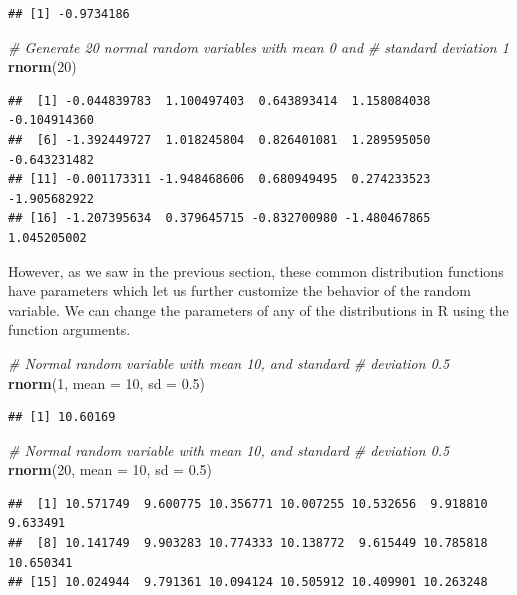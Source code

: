 \documentclass[
]{book}
\newenvironment{Shaded}{\begin{snugshade}}{\end{snugshade}}
\newcommand{\CommentTok}[1]{\textcolor[rgb]{0.56,0.35,0.01}{\textit{#1}}}
\newcommand{\DataTypeTok}[1]{\textcolor[rgb]{0.13,0.29,0.53}{#1}}
\newcommand{\DecValTok}[1]{\textcolor[rgb]{0.00,0.00,0.81}{#1}}
\newcommand{\FloatTok}[1]{\textcolor[rgb]{0.00,0.00,0.81}{#1}}
\newcommand{\KeywordTok}[1]{\textcolor[rgb]{0.13,0.29,0.53}{\textbf{#1}}}
\newcommand{\NormalTok}[1]{#1}
\begin{document}
\begin{verbatim}
## [1] -0.9734186
\end{verbatim}

\begin{Shaded}
\begin{Highlighting}[]
\CommentTok{# Generate 20 normal random variables with mean 0 and}
\CommentTok{# standard deviation 1}
\KeywordTok{rnorm}\NormalTok{(}\DecValTok{20}\NormalTok{)}
\end{Highlighting}
\end{Shaded}

\begin{verbatim}
##  [1] -0.044839783  1.100497403  0.643893414  1.158084038 -0.104914360
##  [6] -1.392449727  1.018245804  0.826401081  1.289595050 -0.643231482
## [11] -0.001173311 -1.948468606  0.680949495  0.274233523 -1.905682922
## [16] -1.207395634  0.379645715 -0.832700980 -1.480467865  1.045205002
\end{verbatim}

However, as we saw in the previous section, these common distribution functions have parameters which let us further customize the behavior of the random variable. We can change the parameters of any of the distributions in R using the function arguments.

\begin{Shaded}
\begin{Highlighting}[]
\CommentTok{# Normal random variable with mean 10, and standard}
\CommentTok{# deviation 0.5}
\KeywordTok{rnorm}\NormalTok{(}\DecValTok{1}\NormalTok{, }\DataTypeTok{mean =} \DecValTok{10}\NormalTok{, }\DataTypeTok{sd =} \FloatTok{0.5}\NormalTok{)}
\end{Highlighting}
\end{Shaded}

\begin{verbatim}
## [1] 10.60169
\end{verbatim}

\begin{Shaded}
\begin{Highlighting}[]
\CommentTok{# Normal random variable with mean 10, and standard}
\CommentTok{# deviation 0.5}
\KeywordTok{rnorm}\NormalTok{(}\DecValTok{20}\NormalTok{, }\DataTypeTok{mean =} \DecValTok{10}\NormalTok{, }\DataTypeTok{sd =} \FloatTok{0.5}\NormalTok{)}
\end{Highlighting}
\end{Shaded}

\begin{verbatim}
##  [1] 10.571749  9.600775 10.356771 10.007255 10.532656  9.918810  9.633491
##  [8] 10.141749  9.903283 10.774333 10.138772  9.615449 10.785818 10.650341
## [15] 10.024944  9.791361 10.094124 10.505912 10.409901 10.263248
\end{verbatim}
\end{document}
